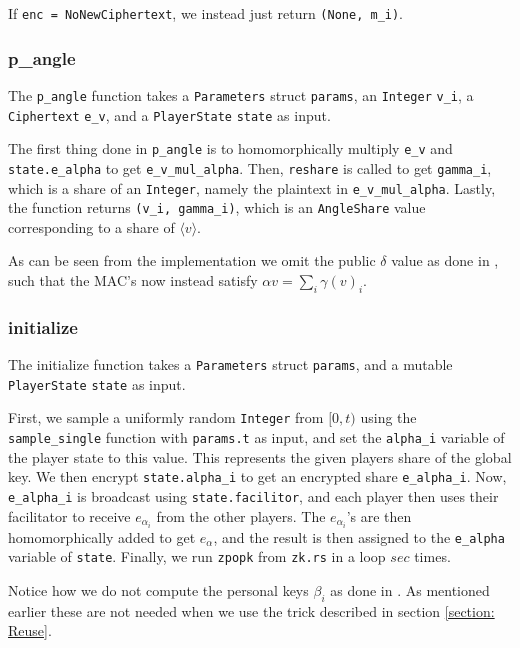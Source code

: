 \documentclass[../main.tex]{subfiles}
\begin{document}
If \lstinline{enc = NoNewCiphertext}, we instead just return \lstinline{(None, m_i)}.

\subsubsection{p\_angle}
The \lstinline{p_angle} function takes a \lstinline{Parameters} struct \lstinline{params}, an \lstinline{Integer} \lstinline{v_i}, a \lstinline{Ciphertext} \lstinline{e_v}, and a \lstinline{PlayerState} \lstinline{state} as input.

The first thing done in \lstinline{p_angle} is to homomorphically multiply \lstinline{e_v} and \lstinline{state.e_alpha} to get \lstinline{e_v_mul_alpha}. Then, \lstinline{reshare} is called to get \lstinline{gamma_i}, which is a share of an \lstinline{Integer}, namely the plaintext in \lstinline{e_v_mul_alpha}. Lastly, the function returns \lstinline{(v_i, gamma_i)}, which is an \lstinline{AngleShare} value corresponding to a share of $\langle v \rangle$.

As can be seen from the implementation we omit the public $\delta$ value as done in \cite{damgaard2013practical}, such that the MAC's now instead satisfy $\alpha v = \sum_i \gamma(v)_i$.
 
\subsubsection{initialize}
The initialize function takes a \lstinline{Parameters} struct \lstinline{params}, and a mutable \lstinline{PlayerState} \lstinline{state} as input.

First, we sample a uniformly random \lstinline{Integer} from $[0, t)$ using the \lstinline{sample_single} function with \lstinline{params.t} as input, and set the \lstinline{alpha_i} variable of the player state to this value. This represents the given players share of the global key. We then encrypt \lstinline{state.alpha_i} to get an encrypted share \lstinline{e_alpha_i}. Now, \lstinline{e_alpha_i} is broadcast using \lstinline{state.facilitor}, and each player then uses their facilitator to receive $e_{\alpha_i}$ from the other players. The $e_{\alpha_i}$'s are then homomorphically added to get $e_\alpha$, and the result is then assigned to the \lstinline{e_alpha} variable of \lstinline{state}. %
Finally, we run \lstinline{zpopk} from \lstinline{zk.rs} in a loop $sec$ times.

Notice how we do not compute the personal keys $\beta_i$ as done in \cite{damgaard2012multiparty}. As mentioned earlier these are not needed when we use the trick described in section \ref{section: Reuse}.
\end{document}
